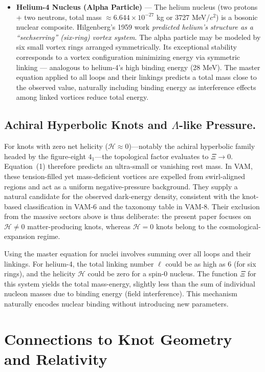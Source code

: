 \begin{itemize}
        \item \textbf{Helium-4 Nucleus (Alpha Particle)} — The helium nucleus (two protons + two neutrons, total mass $\approx 6.644 \times 10^{-27}$ kg or 3727 MeV/$c^2$) is a bosonic nuclear composite. Hilgenberg’s 1959 work \textit{predicted helium’s structure as a “sechserring” (six-ring) vortex system}. The alpha particle may be modeled by six small vortex rings arranged symmetrically. Its exceptional stability corresponds to a vortex configuration minimizing energy via symmetric linking — analogous to helium-4’s high binding energy (28 MeV). The master equation applied to all loops and their linkings predicts a total mass close to the observed value, naturally including binding energy as interference effects among linked vortices reduce total energy.
    \end{itemize}


    \subsection{Achiral Hyperbolic Knots and $\Lambda$-like Pressure.}
         For knots with zero net helicity ($\mathcal{H} \approx 0$)—notably the achiral hyperbolic family headed by the figure-eight $4_1$—the topological factor evaluates to $\Xi \to 0$. Equation~(1) therefore predicts an ultra-small or vanishing rest mass. In VAM, these tension-filled yet mass-deficient vortices are expelled from swirl-aligned regions and act as a uniform negative-pressure background. They supply a natural candidate for the observed dark-energy density, consistent with the knot-based classification in VAM-6 and the taxonomy table in VAM-8. Their exclusion from the massive sectors above is thus deliberate: the present paper focuses on $\mathcal{H} \neq 0$ matter-producing knots, whereas $\mathcal{H} = 0$ knots belong to the cosmological-expansion regime.


    Using the master equation for nuclei involves summing over all loops and their linkings. For helium-4, the total linking number $\ell$ could be as high as 6 (for six rings), and the helicity $\mathcal{H}$ could be zero for a spin-0 nucleus. The function $\Xi$ for this system yields the total mass-energy, slightly less than the sum of individual nucleon masses due to binding energy (field interference). This mechanism naturally encodes nuclear binding without introducing new parameters.

    \section{Connections to Knot Geometry and Relativity}

